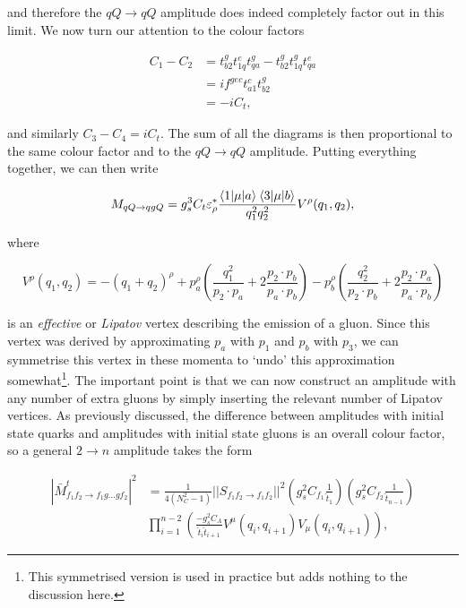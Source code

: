 and therefore the $qQ \to qQ$ amplitude does indeed completely factor out in this limit. We now turn our attention to the colour factors

\begin{equation}
\begin{split}
C_1 - C_2 &= t^g_{b2} t^e_{1q} t^g_{qa} - t^g_{b2} t^g_{1q} t^e_{qa} \\
&=  if^{gec}t^c_{a1}t^g_{b2} \\
&= -i C_t,
\end{split}
\end{equation}

and similarly $C_3 - C_4 = iC_t$. The sum of all the diagrams is then proportional to the same colour factor and to the $qQ \to qQ$ amplitude. Putting everything together, we can then write

\begin{equation}
M_{qQ \to qgQ} = g_s^3 C_t \varepsilon^*_\rho \frac{\mathinner{\langle1\vert\mu\vert a\rangle}_{} \mathinner{\langle3\vert\mu\vert b\rangle}_{}}{q_1^2 q_2^2} V^\rho (q_1, q_2),
\end{equation}

where

\begin{equation}
V^\rho(q_1, q_2) = -(q_1 + q_2)^\rho + p_a^\rho \left( \frac{q_1^2}{p_2 \cdot p_a} + 2 \frac{p_2 \cdot p_b}{p_a \cdot p_b}\right) -  p_b^\rho \left( \frac{q_2^2}{p_2 \cdot p_b} + 2 \frac{p_2 \cdot p_a}{p_a \cdot p_b}\right)
\label{eqn:lipatov}
\end{equation}

is an \emph{effective} or \emph{Lipatov} vertex describing the emission of a gluon. Since this vertex was derived by approximating $p_a$ with $p_1$ and $p_b$ with $p_3$, we can symmetrise this vertex in these momenta to `undo' this approximation somewhat\footnote{This symmetrised version is used in practice but adds nothing to the discussion here.}. The important point is that we can now construct an amplitude with any number of extra gluons by simply inserting the relevant number of Lipatov vertices. As previously discussed, the difference between amplitudes with initial state quarks and amplitudes with initial state gluons is an overall colour factor, so a general $2 \to n$ amplitude takes the form

\begin{equation}
\begin{split}
|\bar{M}^t_{f_1 f_2 \to f_1 g ... g f_2}|^2 &= \frac{1}{4 (N_C^2 - 1)} ||S_{f_1 f_2 \to f_1 f_2} ||^2 \left(g_s^2 C_{f_1} \frac{1}{\hat{t}_1} \right) \left(g_s^2 C_{f_2} \frac{1}{\hat{t}_{n-1}} \right) \\
& \prod_{i=1}^{n-2} \left(\frac{-g_s^2 C_{A}}{\hat{t}_i \hat{t}_{i+1}} V^\mu (q_i, q_{i+1}) V_\mu (q_i, q_{i+1})  \right),
 \end{split}
\end{equation}

